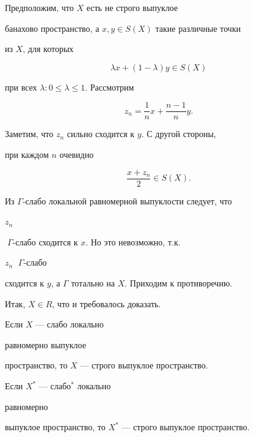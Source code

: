 \begin{pf} Предположим, что $X$ есть не строго выпуклое 


банахово пространство, а $x,y\in S(X)$ такие различные точки 


из $X$, для которых 


$$ 


\lambda x+(1-\lambda)y\in S(X) 


$$ 


при всех $\lambda:0\le\lambda\le 1$. Рассмотрим 


$$ 


z_n=\frac{1}{n}x+\frac{n-1}{n}y. 


$$ 


Заметим, что $z_n$ сильно сходится к $y$. С другой стороны, 


при каждом $n$ очевидно 


$$ 


\frac{x+z_n}{2}\in S(X). 


$$ 


 


Из $\Gamma$-слабо локальной равномерной выпуклости следует, что 


$z_n$ 


$\;\Gamma$-слабо сходится к $x$. Но это невозможно, т.к. 


$z_n$ $\;\Gamma$-слабо 


сходится к $y$, а $\Gamma$ тотально на $X$. Приходим к противоречию. 


Итак, $X\in R$, что и требовалось доказать. 


\end{pf} 


\setcounter{cor}{0} 


 


\begin{cor}[{\myfont{}[2]}] Если $X$ --- слабо локально 


равномерно выпуклое 


пространство, то $X$ --- строго выпуклое пространство. 


\end{cor} 


 


\begin{cor}[{\myfont{}[1]}] Если $X^*$ --- слабо${}^*$ локально 


равномерно 


выпуклое пространство, то $X^*$ --- строго выпуклое пространство. 


\end{cor} 


